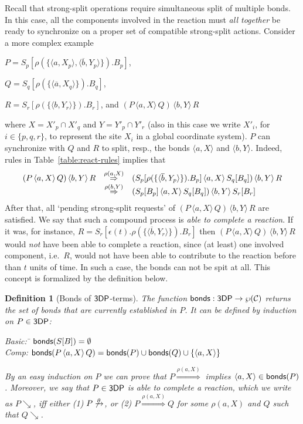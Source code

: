 \documentclass[11pt]{article}
\newcommand{\bonds}{{\sf bonds}}
\newcommand{\proc}{\sf{3DP}}
\newcommand{\ch}[2]{\ensuremath{\langle #1, #2 \rangle}}
\newcommand{\channels}{{\cal C}}
\newcommand{\unionc}[1]{\,\langle #1 \rangle\,}
\newcommand{\nar}[1]{\xrightarrow{#1}}
\newcommand{\dnar}[1]{\stackrel{#1}{\Rightarrow}}
\newtheorem{definition}{Definition}
\begin{document}
Recall that strong-split operations require simultaneous split of multiple bonds. In
this case, all the components involved in the reaction must {\em all together} be ready to
synchronize on a proper set of compatible strong-split actions. Consider a more complex example
\begin{description}
\item $P = S_p[\rho(\{\ch{a}{X_p}, \ch{\overline{b}}{Y_p} \}). B_p]$,
\item $Q = S_q[\rho(\{\ch{\overline{a}} {X_q}\}).B_q]$,
\item $R = S_r[\rho(\{\ch{b}{Y_r} \}). B_r]$, and $(P\unionc{a,X} Q) \unionc{b,Y} R$
\end{description}


where $X = X'_p \cap X'_q$ and $Y = Y'_p \cap Y'_r$ (also in this case we write $X'_i$, for $i \in
\{p, q,r\}$, to represent the site $X_i$ in a global coordinate system).  $P$ can
synchronize with $Q$ and $R$ to split, resp., the bonds $\langle a, X \rangle$ and $\langle b, Y
\rangle$. Indeed, rules in Table~\ref{table:react-rules} implies that
$$
\begin{array}{l c l}
(P\unionc{a,X} Q) \unionc{b,Y} R & \dnar{\rho(a, X)} &
(S_p[\rho(\{\ch{\overline{b}}{Y_p} \}). B_p]\unionc{a,X} S_q[B_q]) \unionc{b,Y} R \\
& \dnar{\rho(b,Y)} & (S_p[B_p]\unionc{a,X} S_q[B_q]) \unionc{b,Y} S_r[B_r]
\end{array}
$$
After that, all `pending strong-split requests' of $(P \unionc{a,X} Q) \unionc{b,Y} R$ are
satisfied. We say that such a compound process is {\em able to complete a reaction}. If it was, for instance, $R = S_r[\epsilon(t).\rho(\{\ch{\overline{b}}{Y_r} \}). B_r]$ then $(P \unionc{a,X} Q) \unionc{b,Y} R$ would {\em not} have been able to complete a reaction, since (at least) one involved component, i.e.\ $R$, would not have been able to contribute to the reaction before than $t$ units of time. In such a case, the bonds can not be spit at all. This concept is formalized by the definition below.

\begin{definition}[Bonds of $\proc$-terms]\label{def:bonds}
The function $\bonds : \proc \rightarrow \wp(\channels)$ returns the set of bonds that are currently
established in $P$. It can be defined by induction on $P\in \proc$:
\begin{tabbing}
Basic: \quad \= $\bonds(S[B]) = \emptyset$\\
Comp: \> $\bonds(P \unionc{a,X} Q) = \bonds(P) \cup
\bonds(Q) \cup \{\langle a, X \rangle \}$
\end{tabbing}

By an easy induction on $P$ we can prove that $P \dnar{\rho(a, X)} $ implies $\langle a, X \rangle
\in \bonds(P)$. Moreover, we say that $P \in \proc$ is {\em able to complete a reaction}, which we
write as $P\searrow$, iff either (1) $P\not\nar{\rho}$, or (2) $P \dnar{\rho(a, X)} Q$ for some
$\rho(a, X)$ and $Q$ such that $Q \searrow$.
\end{definition}
\end{document}
